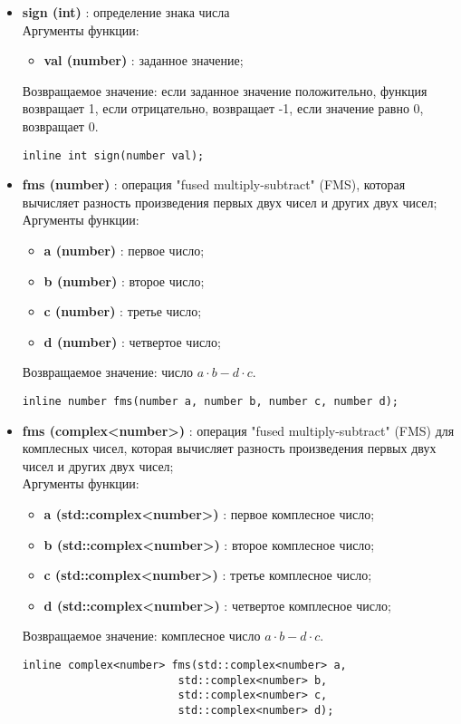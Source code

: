 \documentclass[a4paper,12pt]{article}
\begin{document}
\begin{itemize}
    \item \textbf{sign (int)} : определение знака числа
    \\Аргументы функции:
    \begin{itemize}
        \renewcommand{\labelitemi}{-}
        \item \textbf{val (number)} : заданное значение;
    \end{itemize}

    Возвращаемое значение: если заданное значение положительно, функция возвращает 1, если отрицательно, возвращает -1, если значение равно 0, возвращает 0.

    \begin{lstlisting}[language=С++]
inline int sign(number val); \end{lstlisting}

    \item \textbf{fms (number)} : операция "fused multiply-subtract" (FMS), которая вычисляет разность произведения первых двух чисел и других двух чисел;
    \\Аргументы функции:
    \begin{itemize}
        \renewcommand{\labelitemi}{-}
        \item \textbf{a (number)} : первое число;
        \item \textbf{b (number)} : второе число;
        \item \textbf{c (number)} : третье число;
        \item \textbf{d (number)} : четвертое число;
    \end{itemize}
    Возвращаемое значение: число $a\cdot b - d \cdot c$.

    \begin{lstlisting}[language=С++]
inline number fms(number a, number b, number c, number d); \end{lstlisting}

    \item \textbf{fms (complex<number>)} : операция "fused multiply-subtract" (FMS) для комплесных чисел, которая вычисляет разность произведения первых двух чисел и других двух чисел;
    \\Аргументы функции:
    \begin{itemize}
        \renewcommand{\labelitemi}{-}
        \item \textbf{a (std::complex<number>)} : первое комплесное число;
        \item \textbf{b (std::complex<number>)} : второе комплесное число;
        \item \textbf{c (std::complex<number>)} : третье комплесное число;
        \item \textbf{d (std::complex<number>)} : четвертое комплесное число;
    \end{itemize}
    Возвращаемое значение: комплесное число $a\cdot b - d \cdot c$.
    \begin{lstlisting}[language=С++]
inline complex<number> fms(std::complex<number> a, 
                        std::complex<number> b, 
                        std::complex<number> c,
                        std::complex<number> d); \end{lstlisting}



\end{itemize}
\end{document}
